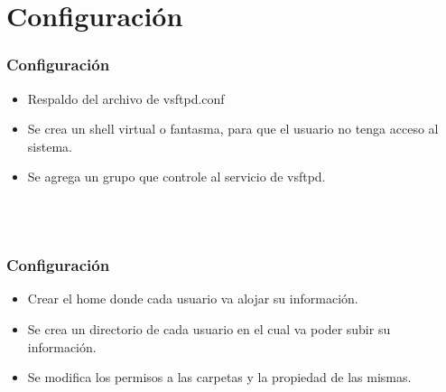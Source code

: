 \section{Configuraci\'on}

  \begin{frame}
    \frametitle{Configuraci\'on}
    \begin{itemize}
      \item Respaldo del archivo de vsftpd.conf
      \item Se crea un shell virtual o fantasma, para que el usuario no tenga acceso al sistema.
      \item Se agrega un grupo que controle al servicio de vsftpd.
    \end{itemize}
    \begin{shell}
      \\
      \\
    \hline\end{shell}
  \end{frame}

  \begin{frame}
    \frametitle{Configuraci\'on}
    \begin{itemize}
      \item Crear el home donde cada usuario va alojar su informaci\'on.
      \item Se crea un directorio de cada usuario en el cual va poder subir su informaci\'on.
      \item Se modifica los permisos a las carpetas y la propiedad de las mismas.
    \end{itemize}
    
    \begin{shell}
      \\
    \hline\end{shell}
  \end{frame}

